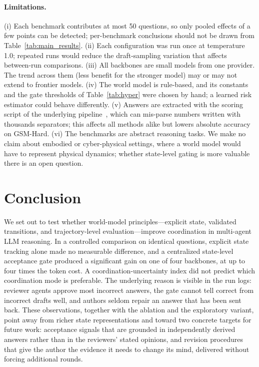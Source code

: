\documentclass[lettersize,journal]{IEEEtran}
\begin{document}
\paragraph{Limitations.}
(i) Each benchmark contributes at most 50 questions, so only pooled effects of a few points can be detected; per-benchmark conclusions should not be drawn from Table~\ref{tab:main_results}.
(ii) Each configuration was run once at temperature 1.0; repeated runs would reduce the draft-sampling variation that affects between-run comparisons.
(iii) All backbones are small models from one provider. The trend across them (less benefit for the stronger model) may or may not extend to frontier models.
(iv) The world model is rule-based, and its constants and the gate thresholds of Table~\ref{tab:hyper} were chosen by hand; a learned risk estimator could behave differently.
(v) Answers are extracted with the scoring script of the underlying pipeline~\cite{wang2025mars}, which can mis-parse numbers written with thousands separators; this affects all methods alike but lowers absolute accuracy on GSM-Hard.
(vi) The benchmarks are abstract reasoning tasks. We make no claim about embodied or cyber-physical settings, where a world model would have to represent physical dynamics; whether state-level gating is more valuable there is an open question.

\section{Conclusion}

We set out to test whether world-model principles---explicit state, validated transitions, and trajectory-level evaluation---improve coordination in multi-agent LLM reasoning.
In a controlled comparison on identical questions, explicit state tracking alone made no measurable difference, and a centralized state-level acceptance gate produced a significant gain on one of four backbones, at up to four times the token cost.
A coordination-uncertainty index did not predict which coordination mode is preferable.
The underlying reason is visible in the run logs: reviewer agents approve most incorrect answers, the gate cannot tell correct from incorrect drafts well, and authors seldom repair an answer that has been sent back.
These observations, together with the ablation and the exploratory variant, point away from richer state representations and toward two concrete targets for future work: acceptance signals that are grounded in independently derived answers rather than in the reviewers' stated opinions, and revision procedures that give the author the evidence it needs to change its mind, delivered without forcing additional rounds.
\end{document}
